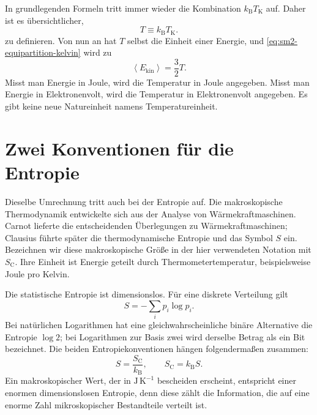 In grundlegenden Formeln tritt immer wieder die Kombination \(k_{\mathrm B}T_{\mathrm K}\) auf. Daher ist es übersichtlicher, \begin{equation}
 T\equiv k_{\mathrm B}T_{\mathrm K}.
 \label{eq:sm2-energy-temperature}
\end{equation} zu definieren.
Von nun an hat \(T\) selbst die Einheit einer Energie, und \eqref{eq:sm2-equipartition-kelvin} wird zu
\begin{equation}
 \left\langle E_{\mathrm{kin}}\right\rangle=\frac{3}{2}T.
 \label{eq:sm2-equipartition-natural}
\end{equation}
Misst man Energie in Joule, wird die Temperatur in Joule angegeben. Misst man Energie in Elektronenvolt, wird die Temperatur in Elektronenvolt angegeben. Es gibt keine neue Natureinheit namens Temperatureinheit.

\section{Zwei Konventionen für die Entropie}

Dieselbe Umrechnung tritt auch bei der Entropie auf. Die makroskopische Thermodynamik entwickelte sich aus der Analyse von Wärmekraftmaschinen. Carnot lieferte die entscheidenden Überlegungen zu Wärmekraftmaschinen; Clausius führte später die thermodynamische Entropie und das Symbol \(S\) ein. Bezeichnen wir diese makroskopische Größe in der hier verwendeten Notation mit \(S_{\mathrm C}\). Ihre Einheit ist Energie geteilt durch Thermometertemperatur, beispielsweise Joule pro Kelvin.

Die statistische Entropie ist dimensionslos. Für eine diskrete Verteilung gilt
\begin{equation}
 S=-\sum_i p_i\log p_i.
 \label{eq:sm2-statistical-entropy}
\end{equation}
Bei natürlichen Logarithmen hat eine gleichwahrscheinliche binäre Alternative die Entropie \(\log2\); bei Logarithmen zur Basis zwei wird derselbe Betrag als ein Bit bezeichnet. Die beiden Entropiekonventionen hängen folgendermaßen zusammen:
\begin{equation}
 S=\frac{S_{\mathrm C}}{k_{\mathrm B}},
 \qquad
 S_{\mathrm C}=k_{\mathrm B}S.
 \label{eq:sm2-entropy-conversion}
\end{equation}
Ein makroskopischer Wert, der in \(\mathrm{J\,K^{-1}}\) bescheiden erscheint, entspricht einer enormen dimensionslosen Entropie, denn diese zählt die Information, die auf eine enorme Zahl mikroskopischer Bestandteile verteilt ist.

